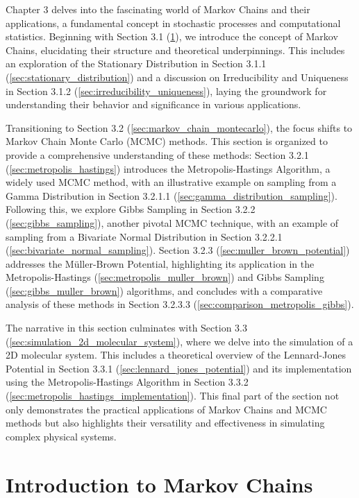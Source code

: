 \documentclass{report}
\begin{document}
Chapter 3 delves into the fascinating world of Markov Chains and their applications, a fundamental concept in stochastic processes and computational statistics. Beginning with Section 3.1 (\ref{sec:introduction_markov_chains}), we introduce the concept of Markov Chains, elucidating their structure and theoretical underpinnings. This includes an exploration of the Stationary Distribution in Section 3.1.1 (\ref{sec:stationary_distribution}) and a discussion on Irreducibility and Uniqueness in Section 3.1.2 (\ref{sec:irreducibility_uniqueness}), laying the groundwork for understanding their behavior and significance in various applications.

Transitioning to Section 3.2 (\ref{sec:markov_chain_montecarlo}), the focus shifts to Markov Chain Monte Carlo (MCMC) methods. This section is organized to provide a comprehensive understanding of these methods: Section 3.2.1 (\ref{sec:metropolis_hastings}) introduces the Metropolis-Hastings Algorithm, a widely used MCMC method, with an illustrative example on sampling from a Gamma Distribution in Section 3.2.1.1 (\ref{sec:gamma_distribution_sampling}). Following this, we explore Gibbs Sampling in Section 3.2.2 (\ref{sec:gibbs_sampling}), another pivotal MCMC technique, with an example of sampling from a Bivariate Normal Distribution in Section 3.2.2.1 (\ref{sec:bivariate_normal_sampling}). Section 3.2.3 (\ref{sec:muller_brown_potential}) addresses the Müller-Brown Potential, highlighting its application in the Metropolis-Hastings (\ref{sec:metropolis_muller_brown}) and Gibbs Sampling (\ref{sec:gibbs_muller_brown}) algorithms, and concludes with a comparative analysis of these methods in Section 3.2.3.3 (\ref{sec:comparison_metropolis_gibbs}).

The narrative in this section culminates with Section 3.3 (\ref{sec:simulation_2d_molecular_system}), where we delve into the simulation of a 2D molecular system. This includes a theoretical overview of the Lennard-Jones Potential in Section 3.3.1 (\ref{sec:lennard_jones_potential}) and its implementation using the Metropolis-Hastings Algorithm in Section 3.3.2 (\ref{sec:metropolis_hastings_implementation}). This final part of the section not only demonstrates the practical applications of Markov Chains and MCMC methods but also highlights their versatility and effectiveness in simulating complex physical systems.

\section{Introduction to Markov Chains}
\label{sec:introduction_markov_chains}
\end{document}

